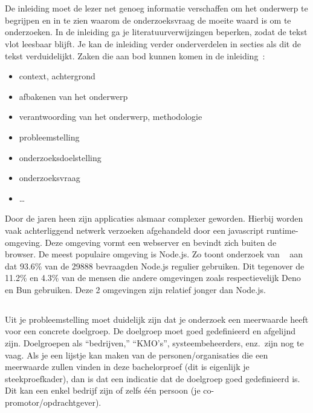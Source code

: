 
\chapter{}%
\label{ch:inleiding}

De inleiding moet de lezer net genoeg informatie verschaffen om het onderwerp te begrijpen en in te zien waarom de onderzoeksvraag de moeite waard is om te onderzoeken. In de inleiding ga je literatuurverwijzingen beperken, zodat de tekst vlot leesbaar blijft. Je kan de inleiding verder onderverdelen in secties als dit de tekst verduidelijkt. Zaken die aan bod kunnen komen in de inleiding~\autocite{Pollefliet2011}:

\begin{itemize}
  \item context, achtergrond
  \item afbakenen van het onderwerp
  \item verantwoording van het onderwerp, methodologie
  \item probleemstelling
  \item onderzoeksdoelstelling
  \item onderzoeksvraag
  \item \ldots
\end{itemize}

Door de jaren heen zijn applicaties alsmaar complexer geworden. Hierbij worden vaak achterliggend netwerk verzoeken afgehandeld door een 
javascript runtime-omgeving. Deze omgeving vormt een webserver en bevindt zich buiten de browser.
De meest populaire omgeving is Node.js. Zo toont onderzoek van ~\textcite{Greif2022} aan dat 93.6\% van de 29888 bevraagden Node.js 
regulier gebruiken.
Dit tegenover de 11.2\% en 4.3\% van de mensen die andere omgevingen zoals respectievelijk Deno en Bun gebruiken.
Deze 2 omgevingen zijn relatief jonger dan Node.js.

\section{}%
\label{sec:probleemstelling}

Uit je probleemstelling moet duidelijk zijn dat je onderzoek een meerwaarde heeft voor een concrete doelgroep. 
De doelgroep moet goed gedefinieerd en afgelijnd zijn. Doelgroepen als ``bedrijven,'' ``KMO's'', systeembeheerders, enz.~zijn nog te vaag. 
Als je een lijstje kan maken van de personen/organisaties die een meerwaarde zullen vinden in deze bachelorproef (dit is eigenlijk je steekproefkader), 
dan is dat een indicatie dat de doelgroep goed gedefinieerd is. Dit kan een enkel bedrijf zijn of zelfs één persoon (je co-promotor/opdrachtgever).

